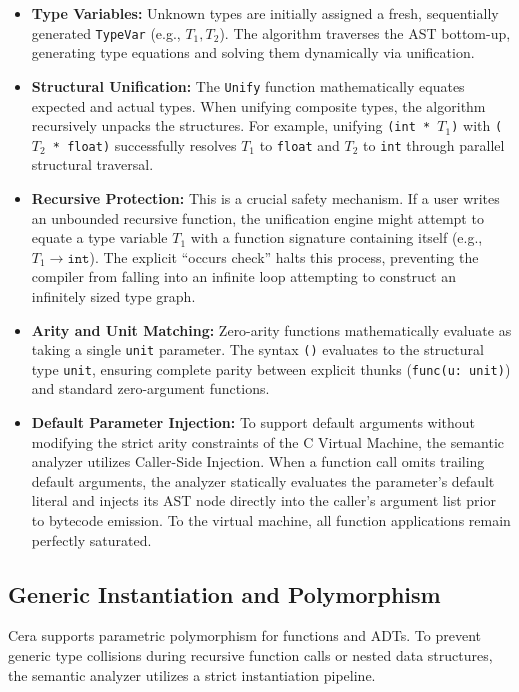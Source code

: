 \documentclass[11pt, a4paper]{article}
\begin{document}
\begin{itemize}
    \item \textbf{Type Variables:} Unknown types are initially assigned a fresh, sequentially generated \texttt{TypeVar} (e.g., $T_1, T_2$). The algorithm traverses the AST bottom-up, generating type equations and solving them dynamically via unification.
    \item \textbf{Structural Unification:} The \texttt{Unify} function mathematically equates expected and actual types. When unifying composite types, the algorithm recursively unpacks the structures. For example, unifying \texttt{(int * $T_1$)} with \texttt{($T_2$ * float)} successfully resolves $T_1$ to \texttt{float} and $T_2$ to \texttt{int} through parallel structural traversal.
    \item \textbf{Recursive Protection:} This is a crucial safety mechanism. If a user writes an unbounded recursive function, the unification engine might attempt to equate a type variable $T_1$ with a function signature containing itself (e.g., $T_1 \rightarrow \texttt{int}$). The explicit ``occurs check'' halts this process, preventing the compiler from falling into an infinite loop attempting to construct an infinitely sized type graph.
    \item \textbf{Arity and Unit Matching:} Zero-arity functions mathematically evaluate as taking a single \texttt{unit} parameter. The syntax \texttt{()} evaluates to the structural type \texttt{unit}, ensuring complete parity between explicit thunks (\texttt{func(u: unit)}) and standard zero-argument functions.
    \item \textbf{Default Parameter Injection:} To support default arguments without modifying the strict arity constraints of the C Virtual Machine, the semantic analyzer utilizes Caller-Side Injection. When a function call omits trailing default arguments, the analyzer statically evaluates the parameter's default literal and injects its AST node directly into the caller's argument list prior to bytecode emission. To the virtual machine, all function applications remain perfectly saturated.
\end{itemize}

\subsection{Generic Instantiation and Polymorphism}
Cera supports parametric polymorphism for functions and ADTs. To prevent generic type collisions during recursive function calls or nested data structures, the semantic analyzer utilizes a strict instantiation pipeline.
\end{document}
